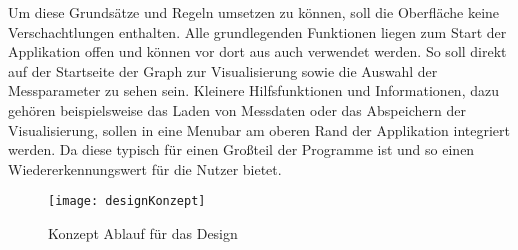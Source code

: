 Um diese Grundsätze und Regeln umsetzen zu können, soll die Oberfläche keine Verschachtlungen enthalten. Alle grundlegenden Funktionen liegen zum Start der Applikation offen und können vor dort aus auch verwendet werden. So soll direkt auf der Startseite der Graph zur Visualisierung sowie die Auswahl der Messparameter zu sehen sein. Kleinere Hilfsfunktionen und Informationen, dazu gehören beispielsweise das Laden von Messdaten oder das Abspeichern der Visualisierung, sollen in eine Menubar am oberen Rand der Applikation integriert werden. Da diese typisch für einen Großteil der Programme ist und so einen Wiedererkennungswert für die Nutzer bietet. 

\begin{figure}[H]
	\centering
	\texttt{[image: designKonzept]}
	\caption{Konzept Ablauf für das Design}
	\label{fig:designKonzept}
\end{figure}